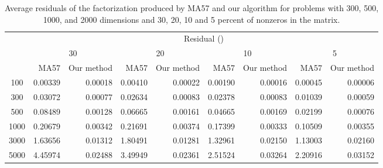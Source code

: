 \documentclass{article}
\begin{document}
\begin{table}
\caption{Average residuals of the factorization produced by MA57 and our algorithm for problems with 300, 500, 1000, and 2000 dimensions and 30, 20, 10 and 5 percent of nonzeros in the matrix.} \label{table3}
\begin{tabular}{|c|r|r|r|r|r|r|r|r|}
\hline
\multirow{3}{*}{} 
&\multicolumn{8}{c|}{Residual ()}\\
\cline{2-9}
&\multicolumn{2}{c|}{30}
&\multicolumn{2}{c|}{20}
&\multicolumn{2}{c|}{10}
&\multicolumn{2}{c|}{5}\\
\cline{2-9}
&MA57
&Our method
&MA57
&Our method
&MA57
&Our method
&MA57
&Our method\\
\hline
100	&	0.00339&	0.00018	&	0.00410&	0.00022	&	0.00190	&	0.00016&	0.00045	&	0.00006	\\													
300	&	0.03072&	0.00077	&	0.02634&	0.00083	&	0.02378&	0.00083	&	0.01039	&	0.00059	\\													
500	&	0.08489&	0.00128	&	0.06665&	0.00161	&	0.04665&	0.00169	&	0.02199&	0.00076	\\													
1000	&	0.20679&	0.00342	&	0.21691&	0.00374	&	0.17399&	0.00333	&	0.10509&	0.00355	\\													
3000	&	1.63656	&	0.01312&	1.80491	&	0.01281&	1.32961	&	0.02150&	1.13003	&	0.02160	\\													
5000	&	4.45974&	0.02488	&	3.49949&	0.02361	&	2.51524&	0.03264	&	2.20916&	0.03152	\\													\hline
\end{tabular}
\end{table}
\end{document}
